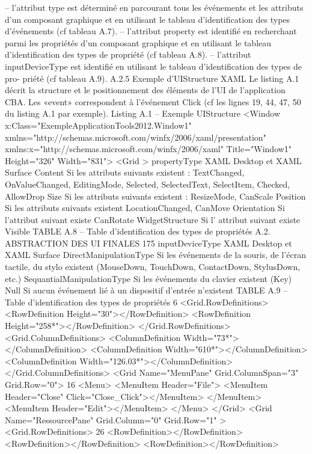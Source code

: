 \documentclass{article}
\begin{document}
– l’attribut type est déterminé en parcourant tous les événements et les attributs d’un composant
graphique et en utilisant le tableau d’identiﬁcation des types d’événements (cf tableau A.7).
– l’attribut property est identiﬁé en recherchant parmi les propriétés d’un composant graphique
et en utilisant le tableau d’identiﬁcation des types de propriété (cf tableau A.8).
– l’attribut inputDeviceType est identiﬁé en utilisant le tableau d’identiﬁcation des types de pro-
priété (cf tableau A.9).
A.2.5
Exemple d’UIStructure XAML
Le listing A.1 décrit la structure et le positionnement des éléments de l’UI de l’application
CBA. Les «event» correspondent à l’événement Click (cf les lignes 19, 44, 47, 50 du listing A.1
par exemple).
Listing A.1 – Exemple UIStructure
<Window x:Class="ExempleApplicationTools2012.Window1"
xmlns="http://schemas.microsoft.com/winfx/2006/xaml/presentation"
xmlns:x="http://schemas.microsoft.com/winfx/2006/xaml"
Title="Window1" Height="326" Width="831">
<Grid >
propertyType
XAML Desktop et XAML Surface
Content
Si les attributs suivants existent : TextChanged, OnValueChanged,
EditingMode, Selected, SelectedText, SelectItem, Checked, AllowDrop
Size
Si les attributs suivants existent : ResizeMode, CanScale
Position
Si les attributs suivants existent LocationChanged, CanMove
Orientation
Si l’attribut suivant existe CanRotate
WidgetStructure
Si l’ attribut suivant existe Visible
TABLE A.8 – Table d’identiﬁcation des types de propriétés
A.2. ABSTRACTION DES UI FINALES
175
inputDeviceType
XAML Desktop et XAML Surface
DirectManipulationType
Si les événements de la souris, de l’écran tactile, du stylo
existent (MouseDown, TouchDown, ContactDown, StylusDown,
etc.)
SequantialManipulationType
Si les événements du clavier existent (Key)
Null
Si aucun événement lié à un dispositif d’entrée n’existent
TABLE A.9 – Table d’identiﬁcation des types de propriétés
6
<Grid.RowDeﬁnitions>
<RowDeﬁnition Height="30"></RowDeﬁnition>
<RowDeﬁnition Height="258*"></RowDeﬁnition>
</Grid.RowDeﬁnitions>
<Grid.ColumnDeﬁnitions>
<ColumnDeﬁnition Width="73*"></ColumnDeﬁnition>
<ColumnDeﬁnition Width="610*"></ColumnDeﬁnition>
<ColumnDeﬁnition Width="126.03*"></ColumnDeﬁnition>
</Grid.ColumnDeﬁnitions>
<Grid Name="MenuPane" Grid.ColumnSpan="3" Grid.Row="0">
16
<Menu>
<MenuItem Header="File">
<MenuItem Header="Close" Click="Close_Click"></MenuItem>
</MenuItem>
<MenuItem Header="Edit"></MenuItem>
</Menu>
</Grid>
<Grid Name="RessourcePane" Grid.Column="0" Grid.Row="1" >
<Grid.RowDeﬁnitions>
26
<RowDeﬁnition></RowDeﬁnition>
<RowDeﬁnition></RowDeﬁnition>
<RowDeﬁnition></RowDeﬁnition>
\end{document}
